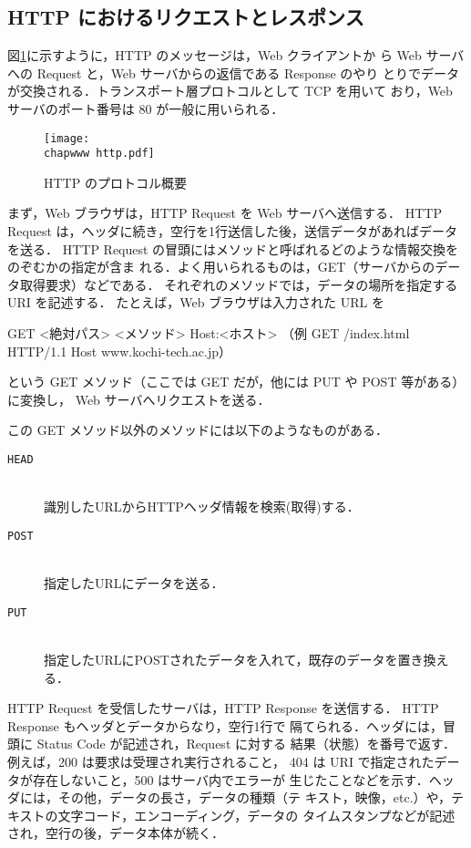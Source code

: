 \subsection{HTTP におけるリクエストとレスポンス}

図\ref{fig:04:http}に示すように，HTTP のメッセージは，Web クライアントか
ら Web サーバへの Request と，Web サーバからの返信である Response のやり
とりでデータが交換される．トランスポート層プロトコルとして TCP を用いて
おり，Web サーバのポート番号は 80 が一般に用いられる．

\begin{figure}[ht]
 \begin{center}
  \texttt{[image: \\chapwww http.pdf]}
  \caption{HTTP のプロトコル概要}
  \label{fig:04:http}
 \end{center}
\end{figure}

まず，Web ブラウザは，HTTP Request を Web サーバへ送信する．
HTTP Request は，ヘッダに続き，空行を1行送信した後，送信データがあればデータを送る．
HTTP Request の冒頭にはメソッドと呼ばれるどのような情報交換をのぞむかの指定が含ま
れる．よく用いられるものは，GET（サーバからのデータ取得要求）などである．
それぞれのメソッドでは，データの場所を指定する URI を記述する．
たとえば，Web ブラウザは入力された URL を
\begin{cli}
GET <絶対パス> <メソッド> Host:<ホスト>
（例 GET /index.html HTTP/1.1 Host www.kochi-tech.ac.jp）
\end{cli}
という GET メソッド（ここでは GET だが，他には PUT や POST 等がある）に変換し，
Web サーバへリクエストを送る．

この GET メソッド以外のメソッドには以下のようなものがある．
\begin{description}
 \item[\texttt{HEAD}] \ \\
       識別したURLからHTTPヘッダ情報を検索(取得)する．
 \item[\texttt{POST}] \ \\
       指定したURLにデータを送る．
 \item[\texttt{PUT}]  \ \\
       指定したURLにPOSTされたデータを入れて，既存のデータを置き換える．
\end{description}

HTTP Request を受信したサーバは，HTTP Response を送信する．
HTTP Response もヘッダとデータからなり，空行1行で
隔てられる．ヘッダには，冒頭に Status Code が記述され，Request に対する
結果（状態）を番号で返す．例えば，200 は要求は受理され実行されること，
404 は URI で指定されたデータが存在しないこと，500 はサーバ内でエラーが
生じたことなどを示す．ヘッダには，その他，データの長さ，データの種類（テ
キスト，映像，etc.）や，テキストの文字コード，エンコーディング，データの
タイムスタンプなどが記述され，空行の後，データ本体が続く．

